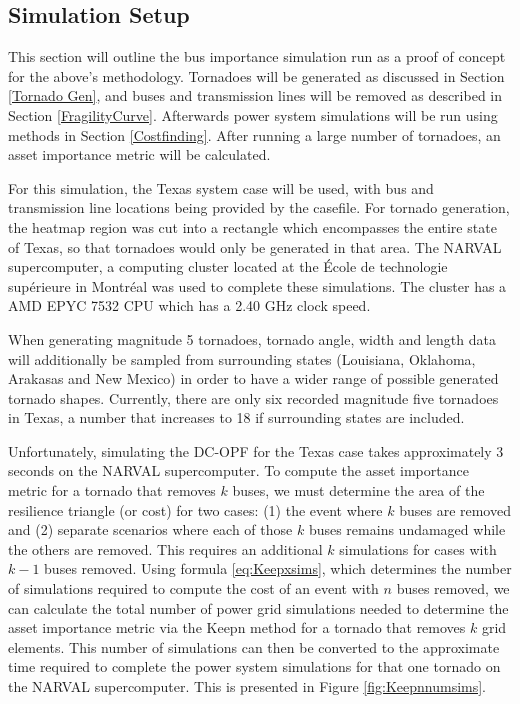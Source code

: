 \documentclass[12pt]{article}
\begin{document}
\subsection{Simulation Setup}
This section will outline the bus importance simulation run as a proof of concept for the above's methodology. Tornadoes will be generated as discussed in Section \ref{Tornado Gen}, and buses and transmission lines will be removed as described in Section \ref{FragilityCurve}. Afterwards power system simulations will be run using methods in Section \ref{Costfinding}. After running a large number of tornadoes, an asset importance metric will be calculated. \par
For this simulation, the Texas system case will be used, with bus and transmission line locations being provided by the casefile. For tornado generation, the heatmap region was cut into a rectangle which encompasses the entire state of Texas, so that tornadoes would only be generated in that area. The NARVAL supercomputer, a computing cluster located at the École de technologie supérieure in Montréal \cite{NARVAL} was used to complete these simulations. The cluster has a AMD EPYC 7532 CPU which has a 2.40 GHz clock speed. \par
When generating magnitude 5 tornadoes, tornado angle, width and length data will additionally be sampled from surrounding states (Louisiana, Oklahoma, Arakasas and New Mexico) in order to have a wider range of possible generated tornado shapes. Currently, there are only six recorded magnitude five tornadoes in Texas, a number that increases to 18 if surrounding states are included. \par
Unfortunately, simulating the DC-OPF for the Texas case takes approximately 3 seconds on the NARVAL supercomputer. To compute the asset importance metric for a tornado that removes $k$ buses, we must determine the area of the resilience triangle (or cost) for two cases: (1) the event where $k$ buses are removed and (2) separate scenarios where each of those $k$ buses remains undamaged while the others are removed. This requires an additional $k$ simulations for cases with $k-1$ buses removed. Using formula \ref{eq:Keepxsims}, which determines the number of simulations required to compute the cost of an event with $n$ buses removed, we can calculate the total number of power grid simulations needed to determine the asset importance metric via the Keepn method for a tornado that removes $k$ grid elements. This number of simulations can then be converted to the approximate time required to complete the power system simulations for that one tornado on the NARVAL supercomputer. This is presented in Figure \ref{fig:Keepnnumsims}. \par
\end{document}
